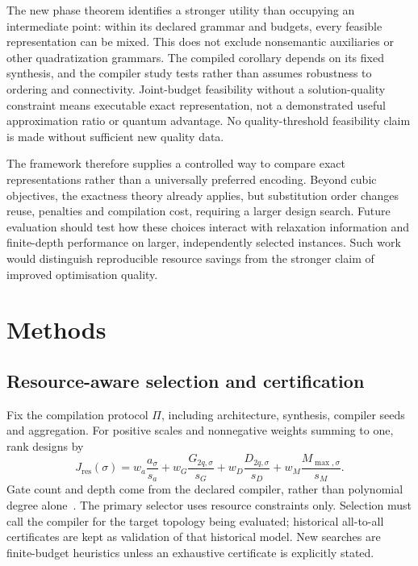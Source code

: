 \documentclass[a4paper,onecolumn,11pt,unpublished]{quantumarticle}
\theoremstyle{remark}
\begin{document}
The new phase theorem identifies a stronger utility than occupying an intermediate point: within its declared grammar and budgets, every feasible representation can be mixed. This does not exclude nonsemantic auxiliaries or other quadratization grammars. The compiled corollary depends on its fixed synthesis, and the compiler study tests rather than assumes robustness to ordering and connectivity. Joint-budget feasibility without a solution-quality constraint means executable exact representation, not a demonstrated useful approximation ratio or quantum advantage. No quality-threshold feasibility claim is made without sufficient new quality data.

The framework therefore supplies a controlled way to compare exact
representations rather than a universally preferred encoding. Beyond
cubic objectives, the exactness theory already applies, but substitution
order changes reuse, penalties and compilation cost, requiring a larger
design search. Future evaluation should test how these choices interact
with relaxation information and finite-depth performance on larger,
independently selected instances. Such work would distinguish reproducible
resource savings from the stronger claim of improved optimisation quality.

\section{Methods}
\label{sec:methodology}
\label{sec:experiments}

\subsection{Resource-aware selection and certification}
\label{sec:selection}
\label{sec:selection-problem}
\label{sec:search-certification}

Fix the compilation protocol $\Pi$, including architecture, synthesis,
compiler seeds and aggregation. For positive scales and nonnegative weights
summing to one, rank designs by
\begin{equation}
J_{\mathrm{res}}(\sigma)=
w_a\frac{a_\sigma}{s_a}+w_G\frac{G_{2q,\sigma}}{s_G}
+w_D\frac{D_{2q,\sigma}}{s_D}+w_M\frac{M_{\max,\sigma}}{s_M}.
\label{eq:Jres}
\end{equation}
Gate count and depth come from the declared compiler, rather than polynomial
degree alone~\cite{Verchere2023,Weidenfeller2022,Schmidbauer2024}.
The primary selector uses resource constraints only. Selection must call the compiler for the target topology being evaluated; historical all-to-all certificates are kept as validation of that historical model. New searches are finite-budget heuristics unless an exhaustive certificate is explicitly stated.
\end{document}

